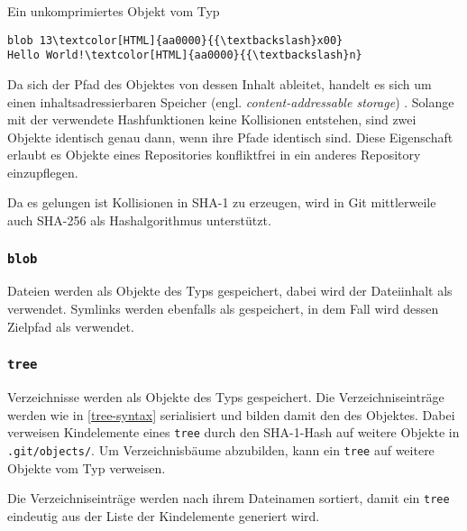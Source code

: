 \documentclass[
	nonacm,%
	screen,%
	sigplan,
]{acmart}
\begin{document}
\begin{example}
	\caption{Ein unkomprimiertes Objekt vom Typ }%
	\label{blob-example}%
	\centering
	\begin{Verbatim}[commandchars=\\\{\},fontsize=\small]
blob 13\textcolor[HTML]{aa0000}{{\textbackslash}x00}
Hello World!\textcolor[HTML]{aa0000}{{\textbackslash}n}
	\end{Verbatim}
\end{example}

\sloppy
Da sich der Pfad des Objektes von dessen Inhalt ableitet, handelt es sich um einen inhaltsadressierbaren Speicher (engl. \emph{content-addressable storage}) \cite{content-addressable-storage}. Solange mit der verwendete Hashfunktionen keine Kollisionen entstehen, sind zwei Objekte identisch genau dann, wenn ihre Pfade identisch sind. Diese Eigenschaft erlaubt es Objekte eines Repositories konfliktfrei in ein anderes Repository einzupflegen. \cite{rsync}

Da es gelungen ist Kollisionen in SHA-1 zu erzeugen, wird in Git mittlerweile auch SHA-256 als Hashalgorithmus unterstützt. \cite{hash-function-transition}

\subsubsection{\texttt{blob}}\label{blob}

Dateien werden als Objekte des Typs  gespeichert, dabei wird der Dateiinhalt als  verwendet. Symlinks \cite{symlink} werden ebenfalls als  gespeichert, in dem Fall wird dessen Zielpfad als  verwendet.

\subsubsection{\texttt{tree}}\label{tree}

\sloppy
Verzeichnisse werden als Objekte des Typs  gespeichert. Die Verzeichniseinträge werden wie in \autoref{tree-syntax} serialisiert und bilden damit den  des Objektes. Dabei verweisen Kindelemente eines \texttt{tree} durch den SHA-1-Hash auf weitere Objekte in \texttt{.git/objects/}. Um Verzeichnisbäume abzubilden, kann ein \texttt{tree} auf weitere Objekte vom Typ  verweisen.

Die Verzeichniseinträge werden nach ihrem Dateinamen sortiert, damit ein \texttt{tree} eindeutig aus der Liste der Kindelemente generiert wird.
\end{document}
